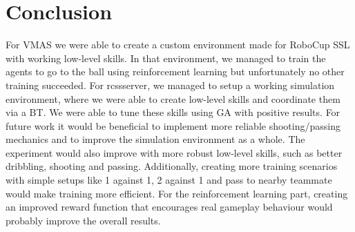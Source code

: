 \section{Conclusion}

For VMAS we were able to create a custom environment made for
RoboCup SSL with working low-level skills. In that environment, we managed to train the agents to go to the
ball using reinforcement learning but unfortunately no
other training succeeded. For rcssserver, we managed to setup a working simulation environment, where we were able to create low-level skills and
coordinate them via a BT. We were able to tune these skills using
GA with positive results.
For future work it would be beneficial to implement more reliable shooting/passing mechanics and to improve the 
simulation environment as a whole. The experiment would also improve with more robust low-level skills, such as
better dribbling, shooting and passing. Additionally, creating more training scenarios with simple setups like 1 against 1,
2 against 1 and pass to nearby teammate would make training more efficient. For the reinforcement learning part, creating
an improved reward function that encourages real gameplay behaviour would probably improve the overall results.